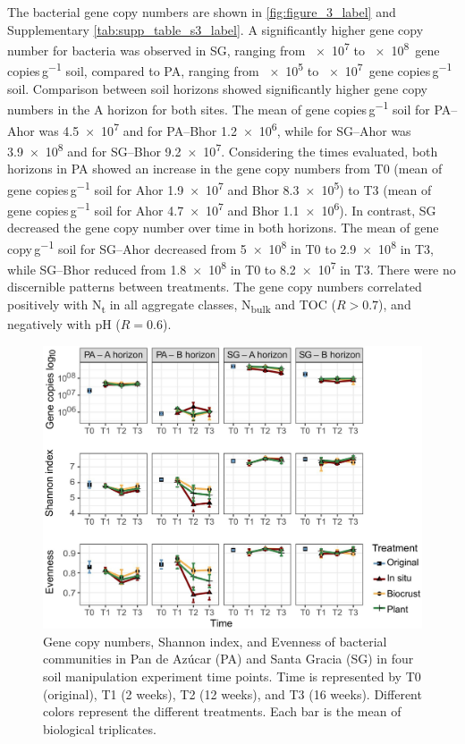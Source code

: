The bacterial gene copy numbers are shown in \cref{fig:figure_3_label} and Supplementary \cref{tab:supp_table_s3_label}. A significantly higher gene copy number for bacteria was observed in SG, ranging from \num{e7} to \num{e8}~gene copies\,\si{\gram^{-1}} soil, compared to PA, ranging from \num{e5} to \num{e7}~gene copies\,\si{\gram^{-1}} soil. Comparison between soil horizons showed significantly higher gene copy numbers in the A horizon for both sites. The mean of gene copies\,\si{\gram^{-1}} soil for PA--Ahor was \num{4.5e7} and for PA--Bhor \num{1.2e6}, while for SG--Ahor was \num{3.9e8} and for SG--Bhor \num{9.2e7}. Considering the times evaluated, both horizons in PA showed an increase in the gene copy numbers from T0 (mean of gene copies\,\si{\gram^{-1}} soil for Ahor \num{1.9e7} and Bhor \num{8.3e5}) to T3 (mean of gene copies\,\si{\gram^{-1}} soil for Ahor \num{4.7e7} and Bhor \num{1.1e6}). In contrast, SG decreased the gene copy number over time in both horizons. The mean of gene copy\,\si{\gram^{-1}} soil for SG--Ahor decreased from \num{5e8} in T0 to \num{2.9e8} in T3, while SG--Bhor reduced from \num{1.8e8} in T0 to \num{8.2e7} in T3. There were no discernible patterns between treatments. The gene copy numbers correlated positively with N\textsubscript{t} in all aggregate classes, N\textsubscript{bulk} and TOC (\(R > 0.7\)), and negatively with pH (\(R = 0.6\)).

\begin{figure}[H]
	\centering
	\includegraphics[width=1\textwidth]{img/M3-Figure_3.jpg}
	\caption{Gene copy numbers, Shannon index, and Evenness of bacterial communities in Pan de Azúcar (PA) and Santa Gracia (SG) in four soil manipulation experiment time points. Time is represented by T0 (original), T1 (2 weeks), T2 (12 weeks), and T3 (16 weeks). Different colors represent the different treatments. Each bar is the mean of biological triplicates.}
	\label{fig:M3-F3}
\end{figure}


